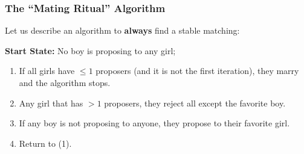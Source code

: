 \documentclass{beamer}
\begin{document}
\begin{frame}
  \frametitle{The ``Mating Ritual'' Algorithm}

  {\larger

    Let us describe an algorithm to {\bf always} find a
    stable matching:

    \bigskip

    {\bf Start State:} No boy is proposing to any girl;
    
    \begin{enumerate}
    \item If all girls have $\leq 1$ proposers (and it is
      not the first iteration), they marry and the algorithm stops.
    \item Any girl that has $> 1$ proposers, they reject all except
      the favorite boy.
    \item If any boy is not proposing to anyone, they propose to
      their favorite girl.
    \item Return to (1).
    \end{enumerate}
  }
\end{frame}
\end{document}
